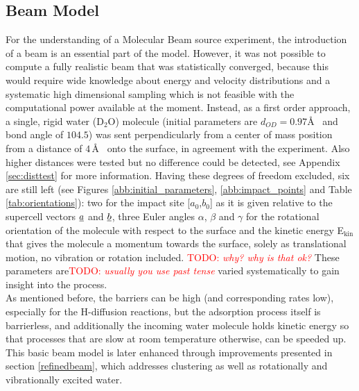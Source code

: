\documentclass[11pt,DIV=13,BCOR=5mm,a4paper,headinclude]{scrbook}
\newcommand\todo[1]{\textcolor{red}{TODO: \textit{{#1}}}}
\begin{document}
\subsection{Beam Model} \label{beammodel}
For the understanding of a Molecular Beam source experiment, the introduction of a beam is an essential part of the model.
However, it was not possible to compute a fully realistic beam that was statistically converged, because this would require wide knowledge about energy and velocity distributions and a systematic high dimensional sampling which is not feasible with the computational power available at the moment.
Instead, as a first order approach, a single, rigid water (D$_2$O) molecule (initial parameters are $d_{OD}=0.97$\AA~ and bond angle of $104.5$\textdegree) was sent perpendicularly from a center of mass position from a distance of $4\,$\AA~ onto the surface, in agreement with the experiment.
Also higher distances were tested but no difference could be detected, see Appendix \ref{sec:disttest} for more information.
Having these degrees of freedom excluded, six are still left (see Figures \ref{abb:initial_parameters}, \ref{abb:impact_points} and Table \ref{tab:orientations}): two for the impact site [$a_0$,$b_0$] as it is given relative to the supercell vectors $\uline{a}$ and $\uline{b}$, three Euler angles $\alpha$, $\beta$ and $\gamma$ for the rotational orientation of the molecule with respect to the surface and the kinetic energy E$_\textrm{kin}$ that gives the molecule a momentum towards the surface, solely as translational motion, no vibration or rotation included. \todo{why? why is that ok?}
These parameters are\todo{usually you use past tense} varied systematically to gain insight into the process.
\\
As mentioned before, the barriers can be high (and corresponding rates low), especially for the H-diffusion reactions, but the adsorption process itself is barrierless, and additionally the incoming water molecule holds kinetic energy so that processes that are slow at room temperature otherwise, can be speeded up.
\\
This basic beam model is later enhanced through improvements presented in section \ref{refinedbeam}, which addresses clustering as well as rotationally and vibrationally excited water.
\end{document}
